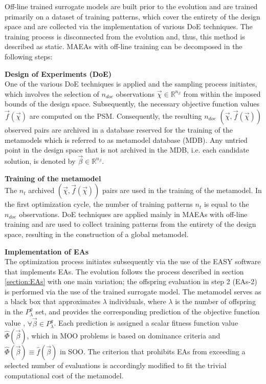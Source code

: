Off-line trained surrogate models are built prior to the 
evolution and are trained primarily on a dataset of training 
patterns, which cover the entirety of the design space and are 
collected via the implementation of various DoE techniques. The 
training process is disconnected from the evolution and, thus, this 
method is described as static. MAEAs with off-line training can be 
decomposed in the following steps:

\begin{OFFL}
\item \textbf{Design of Experiments (DoE)} \\
One of the various DoE techniques is applied and the sampling 
process initiates, which involves the selection of $n_{doe}$ 
observations $\vec{χ} \! \in \! \mathbb{R}^{n_{β}}$ from within 
the imposed bounds of the design space. Subsequently, the necessary 
objective function values $\vec{f}(\vec{χ})$ are computed on the 
PSM. Consequently, the resulting $n_{doe}$ $(\vec{χ},\vec{f}
(\vec{χ}))$ observed pairs are archived in a database reserved for 
the training of the metamodels which is referred to as metamodel 
database (MDB). Any untried point in the design space that is not 
archived in the MDB, i.e. each candidate solution, is denoted by 
$\vec{β} \in \mathbb{R}^{n_{β}}$.

\item \textbf{Training of the metamodel}\\
The $n_{t}$ archived $(\vec{χ},\vec{f}(\vec{χ}))$ pairs  are used 
in the training of the metamodel. In the first optimization cycle, 
the number of training patterns $n_{t}$ is equal to the $n_{doe}$ 
observations. DoE techniques are applied mainly in MAEAs with 
off-line training and are used to collect training patterns from 
the entirety of the design space, resulting in the construction of 
a global metamodel. 

\item \textbf{Implementation of EAs}\\
The optimization process initiates subsequently via the
use of the EASY software that implements EAs. The evolution 
follows the process described in section \ref{section:EAs} 
with one main variation; the offspring evaluation in step 2 
(EAs-2) is performed via the use of the trained surrogate 
model. The metamodel serves as a black box that approximates $λ$ 
individuals, where $λ$ is the number of offspring in the 
$P_{λ}^{g}$ set, and provides the corresponding prediction of 
the objective function value , $\forall \vec{β} \!\in \!P_{λ}^g$. Each 
prediction  is assigned a scalar fitness function 
value $\hat{Φ}(\vec{β})$, which in MOO problems is based on 
dominance criteria and $\hat{Φ}(\vec{β}) \!\equiv \!\hat{f}
(\vec{β})$ in SOO. The criterion that prohibits EAs from exceeding 
a selected number of evaluations is accordingly modified to fit the 
trivial computational cost of the metamodel.  


\end{OFFL}
